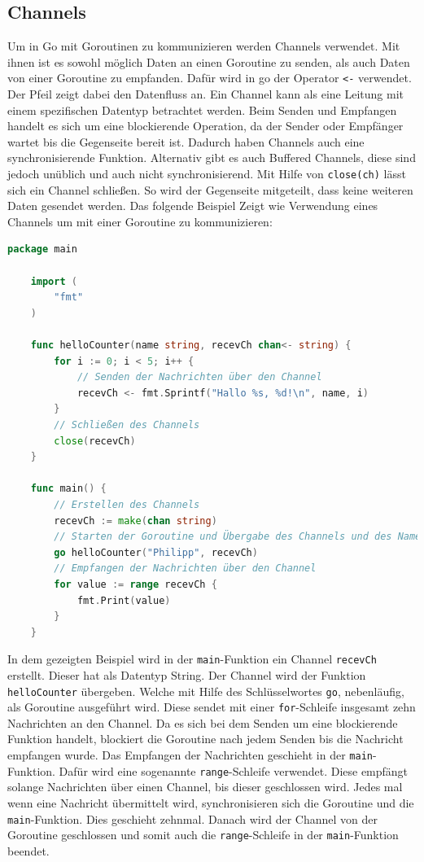 \documentclass[fontsize=12pt,paper=a4,twoside=semi,parskip=half-,headsepline,headinclude]{scrreprt}
\begin{document}
\subsection{Channels}

Um in Go mit Goroutinen zu kommunizieren werden Channels verwendet. Mit ihnen ist es sowohl möglich Daten an einen Goroutine zu senden, als auch Daten von einer Goroutine zu empfanden. Dafür wird in go der Operator \texttt{<-} verwendet. Der Pfeil zeigt dabei den Datenfluss an. Ein Channel kann als eine Leitung mit einem spezifischen Datentyp betrachtet werden. Beim Senden und Empfangen handelt es sich um eine blockierende Operation, da der Sender oder Empfänger wartet bis die Gegenseite bereit ist. Dadurch haben Channels auch eine synchronisierende Funktion. Alternativ gibt es auch Buffered Channels, diese sind jedoch unüblich und auch nicht synchronisierend. Mit Hilfe von \texttt{close(ch)} lässt sich ein Channel schließen. So wird der Gegenseite mitgeteilt, dass keine weiteren Daten gesendet werden. Das folgende Beispiel Zeigt wie Verwendung eines Channels um mit einer Goroutine zu kommunizieren:

\begin{lstlisting}[language=Go,extendedchars=true]
	package main

	import (
		"fmt"
	)

	func helloCounter(name string, recevCh chan<- string) {
		for i := 0; i < 5; i++ {
			// Senden der Nachrichten über den Channel
			recevCh <- fmt.Sprintf("Hallo %s, %d!\n", name, i)
		}
		// Schließen des Channels
		close(recevCh)
	}

	func main() {
		// Erstellen des Channels
		recevCh := make(chan string)
		// Starten der Goroutine und Übergabe des Channels und des Namens
		go helloCounter("Philipp", recevCh)
		// Empfangen der Nachrichten über den Channel
		for value := range recevCh {
			fmt.Print(value)
		}
	}
\end{lstlisting}

In dem gezeigten Beispiel wird in der \texttt{main}-Funktion ein Channel \texttt{recevCh} erstellt. Dieser hat als Datentyp String. Der Channel wird der Funktion \texttt{helloCounter} übergeben. Welche mit Hilfe des Schlüsselwortes \texttt{go}, nebenläufig, als Goroutine ausgeführt wird. Diese sendet mit einer \texttt{for}-Schleife insgesamt zehn Nachrichten an den Channel. Da es sich bei dem Senden um eine blockierende Funktion handelt, blockiert die Goroutine nach jedem Senden bis die Nachricht empfangen wurde. Das Empfangen der Nachrichten geschieht in der \texttt{main}-Funktion. Dafür wird eine sogenannte \texttt{range}-Schleife verwendet. Diese empfängt solange Nachrichten über einen Channel, bis dieser geschlossen wird.  Jedes mal wenn eine Nachricht übermittelt wird, synchronisieren sich die Goroutine und die \texttt{main}-Funktion. Dies geschieht zehnmal. Danach wird der Channel von der Goroutine geschlossen und somit auch die \texttt{range}-Schleife in der \texttt{main}-Funktion beendet.
\end{document}
